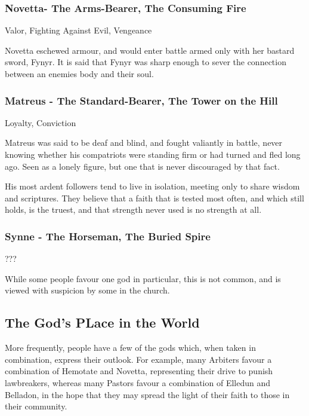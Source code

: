 \subsubsection{Novetta- The Arms-Bearer, The Consuming Fire}

\vspace{2mm}

Valor, Fighting Against Evil, Vengeance

Novetta eschewed armour, and would enter battle armed only with her bastard sword, Fynyr. It is said that Fynyr was sharp enough to sever the connection between an enemies body and their soul.

\subsubsection{Matreus - The Standard-Bearer, The Tower on the Hill}

\vspace{2mm}

Loyalty, Conviction

Matreus was said to be deaf and blind, and fought valiantly in battle, never knowing whether his compatriots were standing firm or had turned and fled long ago. Seen as a lonely figure, but one that is never discouraged by that fact.

His most ardent followers tend to live in isolation, meeting only to share wisdom and scriptures. They believe that a faith that is tested most often, and which still holds, is the truest, and that strength never used is no strength at all.

\subsubsection{Synne - The Horseman, The Buried Spire}

\vspace{2mm}

???

While some people favour one god in particular, this is not common, and is viewed with suspicion by some in the church.

\subsection*{The God's PLace in the World}

More frequently, people have a few of the gods which, when taken in combination, express their outlook. For example, many Arbiters favour a combination of Hemotate and Novetta, representing their drive to punish lawbreakers, whereas many Pastors favour a combination of Elledun and Belladon, in the hope that they may spread the light of their faith to those in their community.


